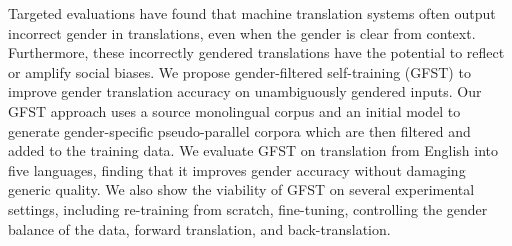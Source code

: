 Targeted evaluations have found that machine translation systems often output incorrect gender in translations, even when the gender is clear from context. Furthermore, these incorrectly gendered translations have the potential to reflect or amplify social biases. We propose gender-filtered self-training (GFST) to improve gender translation accuracy on unambiguously gendered inputs. Our GFST approach uses a source monolingual corpus and an initial model to generate gender-specific pseudo-parallel corpora which are then filtered and added to the training data. We evaluate GFST on translation from English into five languages, finding that it improves gender accuracy without damaging generic quality. We also show the viability of GFST on several experimental settings, including re-training from scratch, fine-tuning, controlling the gender balance of the data, forward translation, and back-translation.
